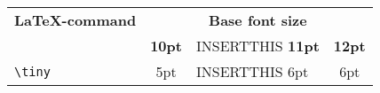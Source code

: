 \documentclass[10pt, a4paper]{article}
\begin{document}
\begin{tabular}{lc>{INSERTTHIS}p{5cm}c}
\hline
\textbf{\LaTeX-command} & \multicolumn{3}{c}{\textbf{Base font size}}\\
\cline{2-4} & \textbf{10pt} & \textbf{11pt} & \textbf{12pt}\\
\verb_\tiny_ & 5pt & 6pt & 6pt\\
\hline
\end{tabular}
\end{document}
